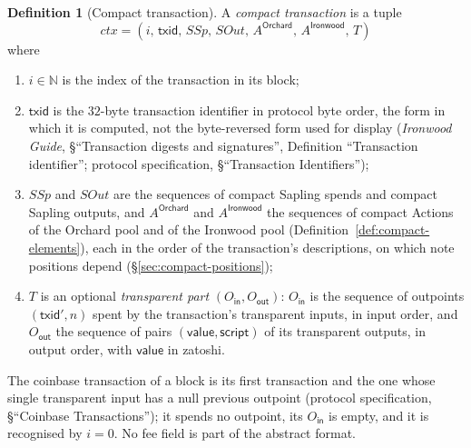 \documentclass[11pt,a4paper]{article}
\theoremstyle{definition}
\newtheorem{definition}[theorem]{Definition}
\newcommand{\N}{\mathbb{N}}
\begin{document}
\begin{definition}[Compact transaction]\label{def:compact-tx}
A \emph{compact transaction} is a tuple
\[
  \mathit{ctx} = (i,\, \mathsf{txid},\, \mathit{SSp},\, \mathit{SOut},\,
    A^{\mathsf{Orchard}},\, A^{\mathsf{Ironwood}},\, T)
\]
where
\begin{enumerate}
\item $i \in \N$ is the index of the transaction in its block;
\item $\mathsf{txid}$ is the $32$-byte transaction identifier in protocol
  byte order, the form in which it is computed, not the byte-reversed form
  used for display (\emph{Ironwood Guide}, \S``Transaction digests and
  signatures'', Definition ``Transaction identifier''; protocol specification,
  \S``Transaction Identifiers'');
\item $\mathit{SSp}$ and $\mathit{SOut}$ are the sequences of compact Sapling
  spends and compact Sapling outputs, and $A^{\mathsf{Orchard}}$ and
  $A^{\mathsf{Ironwood}}$ the sequences of compact Actions of the Orchard
  pool and of the Ironwood pool (Definition~\ref{def:compact-elements}),
  each in the order of the transaction's descriptions, on which note
  positions depend (\S\ref{sec:compact-positions});
\item $T$ is an optional \emph{transparent part} $(O_{\mathsf{in}},
  O_{\mathsf{out}})$: $O_{\mathsf{in}}$ is the sequence of outpoints
  $(\mathsf{txid}', n)$ spent by the transaction's transparent inputs, in
  input order, and $O_{\mathsf{out}}$ the sequence of pairs
  $(\mathsf{value}, \mathsf{script})$ of its transparent outputs, in output
  order, with $\mathsf{value}$ in zatoshi.
\end{enumerate}
The coinbase transaction of a block is its first transaction and the one
whose single transparent input has a null previous outpoint (protocol
specification, \S``Coinbase Transactions''); it spends no outpoint, its
$O_{\mathsf{in}}$ is empty, and it is recognised by $i = 0$. No fee field is
part of the abstract format.
\end{definition}
\end{document}
